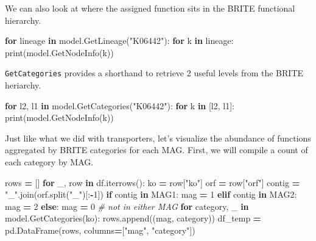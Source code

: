 \documentclass[
]{book}
\newenvironment{Shaded}{\begin{snugshade}}{\end{snugshade}}
\newcommand{\BuiltInTok}[1]{#1}
\newcommand{\CommentTok}[1]{\textcolor[rgb]{0.56,0.35,0.01}{\textit{#1}}}
\newcommand{\ControlFlowTok}[1]{\textcolor[rgb]{0.13,0.29,0.53}{\textbf{#1}}}
\newcommand{\DecValTok}[1]{\textcolor[rgb]{0.00,0.00,0.81}{#1}}
\newcommand{\KeywordTok}[1]{\textcolor[rgb]{0.13,0.29,0.53}{\textbf{#1}}}
\newcommand{\NormalTok}[1]{#1}
\newcommand{\OperatorTok}[1]{\textcolor[rgb]{0.81,0.36,0.00}{\textbf{#1}}}
\newcommand{\StringTok}[1]{\textcolor[rgb]{0.31,0.60,0.02}{#1}}
\begin{document}
We can also look at where the assigned function sits in the BRITE functional hierarchy.

\begin{Shaded}
\begin{Highlighting}[numbers=left,,]
\ControlFlowTok{for}\NormalTok{ lineage }\KeywordTok{in}\NormalTok{ model.GetLineage(}\StringTok{"K06442"}\NormalTok{):}
    \ControlFlowTok{for}\NormalTok{ k }\KeywordTok{in}\NormalTok{ lineage:}
        \BuiltInTok{print}\NormalTok{(model.GetNodeInfo(k))}
\end{Highlighting}
\end{Shaded}

\texttt{GetCategories} provides a shorthand to retrieve 2 useful levels from the BRITE heriarchy.

\begin{Shaded}
\begin{Highlighting}[numbers=left,,]
\ControlFlowTok{for}\NormalTok{ l2, l1 }\KeywordTok{in}\NormalTok{ model.GetCategories(}\StringTok{"K06442"}\NormalTok{):}
    \ControlFlowTok{for}\NormalTok{ k }\KeywordTok{in}\NormalTok{ [l2, l1]:}
        \BuiltInTok{print}\NormalTok{(model.GetNodeInfo(k))}
\end{Highlighting}
\end{Shaded}

Just like what we did with transporters, let's visualize the abundance of functions aggregated by BRITE
categories for each MAG. First, we will compile a count of each category by MAG.

\begin{Shaded}
\begin{Highlighting}[numbers=left,,]
\NormalTok{rows }\OperatorTok{=}\NormalTok{ []}
\ControlFlowTok{for}\NormalTok{ \_, row }\KeywordTok{in}\NormalTok{ df.iterrows():}
\NormalTok{    ko }\OperatorTok{=}\NormalTok{ row[}\StringTok{"ko"}\NormalTok{]}
\NormalTok{    orf }\OperatorTok{=}\NormalTok{ row[}\StringTok{"orf"}\NormalTok{]}
\NormalTok{    contig }\OperatorTok{=} \StringTok{"\_"}\NormalTok{.join(orf.split(}\StringTok{"\_"}\NormalTok{)[:}\OperatorTok{{-}}\DecValTok{1}\NormalTok{])}
    \ControlFlowTok{if}\NormalTok{ contig }\KeywordTok{in}\NormalTok{ MAG1:}
\NormalTok{        mag }\OperatorTok{=} \DecValTok{1}
    \ControlFlowTok{elif}\NormalTok{ contig }\KeywordTok{in}\NormalTok{ MAG2:}
\NormalTok{        mag }\OperatorTok{=} \DecValTok{2}
    \ControlFlowTok{else}\NormalTok{:}
\NormalTok{        mag }\OperatorTok{=} \DecValTok{0} \CommentTok{\# not in either MAG}
    \ControlFlowTok{for}\NormalTok{ category, \_ }\KeywordTok{in}\NormalTok{ model.GetCategories(ko):}
\NormalTok{        rows.append((mag, category))}
\NormalTok{df\_temp }\OperatorTok{=}\NormalTok{ pd.DataFrame(rows, columns}\OperatorTok{=}\NormalTok{[}\StringTok{"mag"}\NormalTok{, }\StringTok{"category"}\NormalTok{])}
\end{Highlighting}
\end{Shaded}
\end{document}
